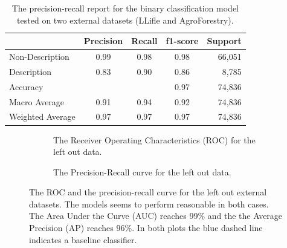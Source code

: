 \documentclass[a4paper, 12pt, oneside]{book} %
\begin{document}
\begin{table}[h]
    \centering
    \caption[Precision-recall report for left out datasets]{The precision-recall report for the binary classification model tested on two external datasets (LLifle and AgroForestry).}
    \label{tab:precision_recall_descriptionsmodel_external}
    \begin{tabular}{@{}lcccr@{}}
    \cmidrule(l){2-5}
     & \multicolumn{1}{l}{Precision} & \multicolumn{1}{l}{Recall} & \multicolumn{1}{l}{f1-score} & \multicolumn{1}{l}{Support} \\ \midrule
    Non-Description  & 0.99 & 0.98 & 0.98 & 66,051 \\
    Description      & 0.83 & 0.90 & 0.86 & 8,785  \\ \midrule
    Accuracy         &      &      & 0.97 & 74,836 \\
    Macro Average    & 0.91 & 0.94 & 0.92 & 74,836 \\
    Weighted Average & 0.97 & 0.97 & 0.97 & 74,836 \\ \bottomrule
    \end{tabular}
\end{table}

\begin{figure} [h]
     \centering
     \begin{subfigure}[b]{0.49\textwidth}
         \centering
         
         \caption{The Receiver Operating Characteristics (ROC) for the left out data.}
         \label{fig:ROC_test_external}
     \end{subfigure}
     \hfill
     \begin{subfigure}[b]{0.49\textwidth}
         \centering
         
         \caption{The Precision-Recall curve for the left out data.}
         \label{fig:precision_recall_curve_test_external}
     \end{subfigure}
     \caption[ROC and precision recall curves for left out datasets]{The ROC and the precision-recall curve for the left out external datasets. The models seems to perform reasonable in both cases. The Area Under the Curve (AUC) reaches 99\% and the the Average Precision (AP) reaches 96\%. In both plots the blue dashed line indicates a baseline classifier.}
\end{figure}
\end{document}
